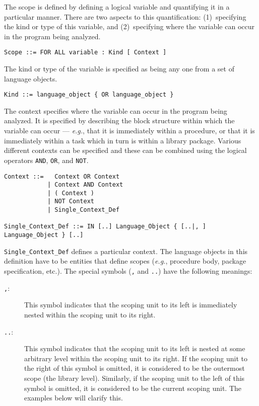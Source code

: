 The scope is defined by defining a logical variable and quantifying
it in a particular manner.  There are two aspects to this quantification:
(1)~specifying the kind or type of this variable, and (2)~specifying
where the variable can occur in the program being analyzed.

\begin{verbatim}
Scope ::= FOR ALL variable : Kind [ Context ]
\end{verbatim}

The kind or type of the variable is specified as being any one from a
set of language objects.

\begin{verbatim}
Kind ::= language_object { OR language_object }
\end{verbatim}

The context specifies where the variable can occur in the program being
analyzed.  It is specified by describing the block structure within which
the variable can occur --- {\it e.g.}, that it is immediately within a
procedure, or that it is immediately within a task which in turn is within
a library package.  Various different contexts can be specified and these
can be combined using the logical operators {\tt AND}, {\tt OR}, and
{\tt NOT}.

\begin{verbatim}
Context ::=   Context OR Context
            | Context AND Context
            | ( Context )
            | NOT Context
            | Single_Context_Def

Single_Context_Def ::= IN [..] Language_Object { [..|, ] Language_Object } [..]
\end{verbatim}

{\tt Single\_Context\_Def} defines a particular context.  The language
objects in this definition have to be entities that define scopes
({\it e.g.}, procedure body, package specification, etc.).  The special
symbols ({\tt ,} and {\tt ..}) have the following meanings:

\begin{description}
\item[{\tt ,}:]
This symbol indicates that the scoping unit to its left is immediately
nested within the scoping unit to its right.
\item[{\tt ..}:]
This symbol indicates that the scoping unit to its left is nested at
some arbitrary level within the scoping unit to its right.  If the
scoping unit to the right of this symbol is omitted, it is considered
to be the outermost scope (the library level).  Similarly, if the
scoping unit to the left of this symbol is omitted, it is considered
to be the current scoping unit.  The examples below will clarify this.
\end{description}

